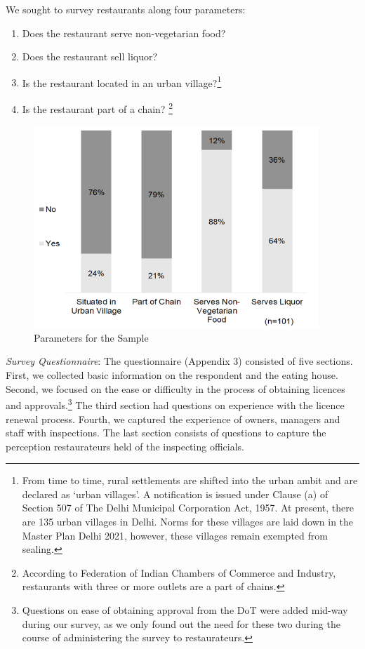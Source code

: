 \documentclass[a4paper, 12pt]{article}
\begin{document}
		
		
		We sought to survey restaurants along four parameters:
		\begin{enumerate}[nosep]
			\item Does the restaurant serve non-vegetarian food?
			\item Does the restaurant sell liquor?
			\item Is the restaurant located in an urban village?\footnote{From time to time, rural settlements are shifted into the urban ambit and are declared as ‘urban villages’. A notification is issued under Clause (a) of Section 507 of The Delhi Municipal 
Corporation Act, 1957. At present, there are 135 urban villages in Delhi. Norms for these villages are laid down in the Master Plan Delhi 2021, however, these villages remain exempted from sealing.} 
			\item Is the restaurant part of a chain? \footnote{According to Federation of Indian Chambers of Commerce and Industry, restaurants with three or more outlets are a part of chains.}
		\end{enumerate}

		\begin{figure}[H]
                    	\centering
                    	\includegraphics[height = 3in]{Figure9.png}
                    	\caption[Optional Caption]{Parameters for the Sample}%
		\end{figure}

		\textit{Survey Questionnaire}: The questionnaire (Appendix 3) consisted of five sections. First, we collected basic information on the respondent and the eating house. Second, we focused on the ease or difficulty in the process of obtaining licences and 
approvals.\footnote{Questions on ease of obtaining approval from the DoT were added mid-way during our survey, as we only found out the need for these two during the course of administering the survey to restaurateurs.} The third section had questions on 
experience with the licence renewal process. Fourth, we captured the experience of owners, managers and staff with inspections. The last section consists of questions to capture the perception restaurateurs held of the inspecting officials.
\end{document}
